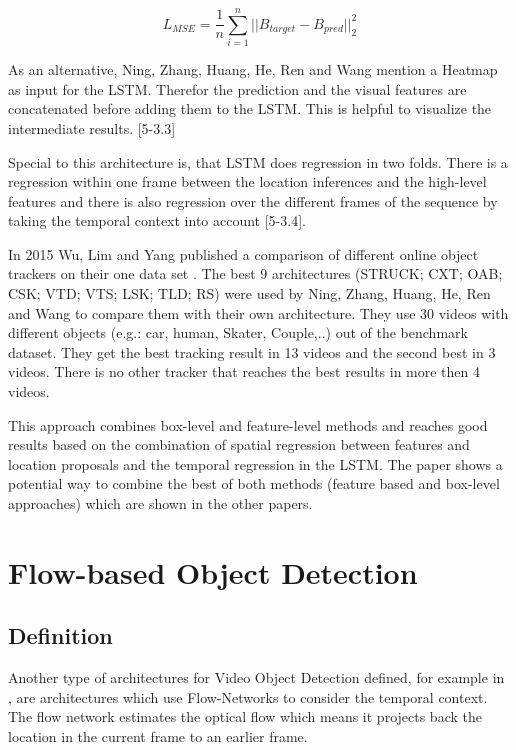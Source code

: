 \documentclass[conference]{IEEEtran}
\begin{document}
\[ L_{MSE} = \dfrac{1}{n} \sum_{i = 1}^n ||B_{target}-B_{pred}||_{2}^2 \] \newline

As an alternative, Ning, Zhang, Huang, He, Ren and Wang mention a Heatmap as  input for the LSTM. Therefor the prediction and the visual features are concatenated before adding them to the LSTM. This is helpful to visualize the intermediate results. [5-3.3] \newline

Special to this architecture is, that LSTM does regression in two folds. There is a regression within one frame between the location inferences and the high-level features and there is also regression over the different frames of the sequence by taking the temporal context into account [5-3.4].  \newline

In 2015 Wu, Lim and Yang published a comparison of different online object trackers on their one data set \cite{b28}. The best 9 architectures (STRUCK; CXT; OAB; CSK; VTD; VTS; LSK; TLD; RS) were used by Ning, Zhang, Huang, He, Ren and Wang to compare them with their own architecture. They use 30 videos with different objects (e.g.: car, human, Skater, Couple,..) out of the benchmark \cite{b28} dataset. They get the best tracking result in 13 videos and the second best in 3 videos. There is no other tracker that reaches the best results in more then 4 videos. \newline

This approach combines box-level and feature-level methods and reaches good results based on the combination of spatial regression between features and location proposals and the temporal regression in the LSTM. The paper shows a potential way to combine the best of both methods (feature based and box-level approaches) which are shown in the other papers. 

\section{Flow-based Object Detection}

\subsection{Definition}
Another type  of architectures for Video Object Detection defined, for example in \cite{b3}, are architectures which use Flow-Networks to consider the temporal context. The flow network estimates the optical flow which means it projects back the location in the current frame to an earlier frame. 
\end{document}
